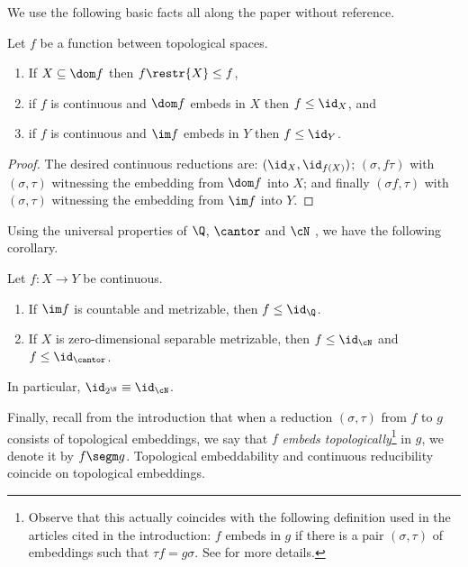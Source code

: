 We use the following basic facts all along the paper without reference.

\begin{proposition}
Let $f$ be a function between topological spaces.
\begin{enumerate}
\item If $X\subseteq\dom f$ then $f\restr{X}\leq f$,
\item if $f$ is continuous and $\dom f$ embeds in $X$ then $f\leq\id_X$, and
\item if $f$ is continuous and $\im f$ embeds in $Y$ then $f\leq\id_Y$.
\end{enumerate}
\end{proposition}

\begin{proof}
The desired continuous reductions are:
$(\id_X, \id_{f(X)})$; $(\sigma, f\tau)$ with $(\sigma,\tau)$ witnessing the embedding from $\dom f$ into $X$;
and finally $(\sigma f, \tau)$ with $(\sigma,\tau)$ witnessing the embedding from $\im f$ into $Y$.
\end{proof}

Using the universal properties of $\Q$, $\cantor$ and $\cN$ \cite[(7.12),(7.8)]{kechris}, we have the following corollary.
\begin{Corollary}\label{ConsequencesofUniversality}
Let $f:X\to Y$ be continuous.
\begin{enumerate}
\item If $\im f$ is countable and metrizable, then $f\leq \id_\Q$.
\item If $X$ is zero-dimensional separable metrizable, then $f\leq \id_{\cN}$ and $f\leq \id_{\cantor}$. 
\end{enumerate}
In particular, $\id_{2^\N}\equiv \id_{\cN}$.
\end{Corollary}


Finally, recall from the introduction that when a reduction $(\sigma,\tau)$ from $f$ to $g$ consists of topological embeddings, we say that $f$ \emph{embeds topologically}\footnote{Observe that this actually coincides with   the following definition used in the articles cited in the introduction: $f$ embeds in $g$ if there is a pair $(\sigma, \tau)$ of embeddings such that $\tau f=g\sigma$. See \cite[Section 3]{embeddabilityCPZ} for more details.}
 in $g$, we denote it by $f\segm g$.
Topological embeddability and continuous reducibility coincide on topological embeddings.

